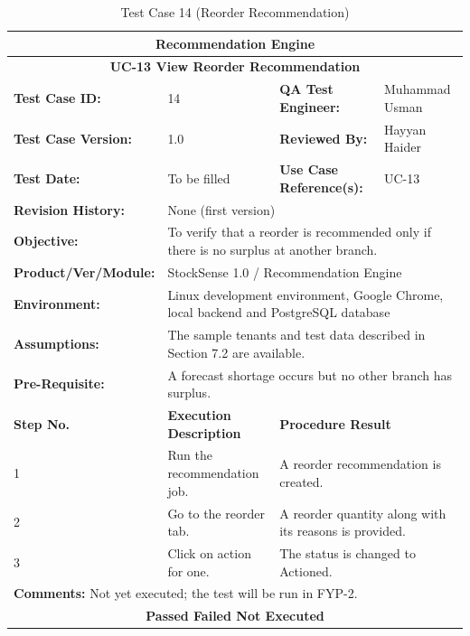\documentclass{StockSense}
\begin{document}
\begin{table}[!htbp]
\centering
\caption{Test Case 14 (Reorder Recommendation)}
{\small\linespread{1}\selectfont\renewcommand{\arraystretch}{1.25}
\begin{tabular}{|p{}|p{}|p{}|p{}|}
\hline
\multicolumn{4}{|c|}{\textbf{Recommendation Engine}} \\ \hline
\multicolumn{4}{|c|}{\textbf{UC-13 View Reorder Recommendation}} \\ \hline
\textbf{Test Case ID:} & 14 & \textbf{QA Test Engineer:} & Muhammad Usman \\ \hline
\textbf{Test Case Version:} & 1.0 & \textbf{Reviewed By:} & Hayyan Haider \\ \hline
\textbf{Test Date:} & To be filled & \textbf{Use Case Reference(s):} & UC-13 \\ \hline
\textbf{Revision History:} & \multicolumn{3}{p{\dimexpr0.70\textwidth+4\tabcolsep\relax}|}{None (first version)} \\ \hline
\textbf{Objective:} & \multicolumn{3}{p{\dimexpr0.70\textwidth+4\tabcolsep\relax}|}{To verify that a reorder is recommended only if there is no surplus at another branch.} \\ \hline
\textbf{Product/Ver/Module:} & \multicolumn{3}{p{\dimexpr0.70\textwidth+4\tabcolsep\relax}|}{StockSense 1.0 / Recommendation Engine} \\ \hline
\textbf{Environment:} & \multicolumn{3}{p{\dimexpr0.70\textwidth+4\tabcolsep\relax}|}{Linux development environment, Google Chrome, local backend and PostgreSQL database} \\ \hline
\textbf{Assumptions:} & \multicolumn{3}{p{\dimexpr0.70\textwidth+4\tabcolsep\relax}|}{The sample tenants and test data described in Section 7.2 are available.} \\ \hline
\textbf{Pre-Requisite:} & \multicolumn{3}{p{\dimexpr0.70\textwidth+4\tabcolsep\relax}|}{A forecast shortage occurs but no other branch has surplus.} \\ \hline
\textbf{Step No.} & \textbf{Execution Description} & \multicolumn{2}{l|}{\textbf{Procedure Result}} \\ \hline
1 & Run the recommendation job. & \multicolumn{2}{p{\dimexpr0.42\textwidth+2\tabcolsep\relax}|}{A reorder recommendation is created.} \\ \hline
2 & Go to the reorder tab. & \multicolumn{2}{p{\dimexpr0.42\textwidth+2\tabcolsep\relax}|}{A reorder quantity along with its reasons is provided.} \\ \hline
3 & Click on action for one. & \multicolumn{2}{p{\dimexpr0.42\textwidth+2\tabcolsep\relax}|}{The status is changed to Actioned.} \\ \hline
\multicolumn{4}{|l|}{\textbf{Comments:} Not yet executed; the test will be run in FYP-2.} \\ \hline
\multicolumn{4}{|c|}{\textbf{Passed \quad Failed \quad Not Executed}} \\ \hline
\end{tabular}\par}
\end{table}
\end{document}
